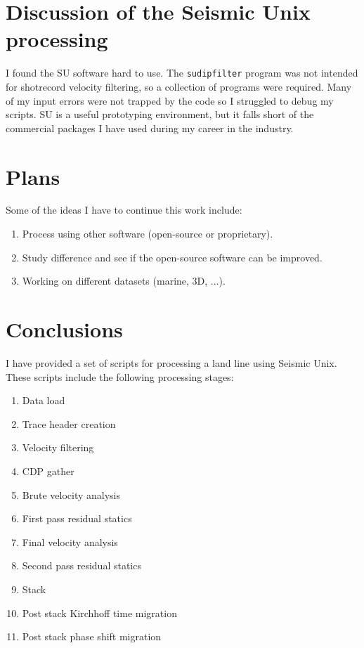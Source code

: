 \section{Discussion of the Seismic Unix processing}
I found the SU software hard to use.  The \texttt{sudipfilter} program
was not intended for shotrecord velocity filtering, so a collection of
programs were required.  Many of my input errors were not trapped by
the code so I struggled to debug my scripts.  SU is a useful
prototyping environment, but it falls short of the commercial packages
I have used during my career in the industry.

\section{Plans}
Some of the ideas I have to continue this work include:

\begin{enumerate}
\item Process using other software (open-source or proprietary). 
\item Study difference and see if the open-source software can be improved.
\item Working on different datasets (marine, 3D, ...).
\end{enumerate}

\section{Conclusions}
I have provided a set of scripts for processing a land line using
Seismic Unix. These scripts include the following processing stages:
\begin{enumerate}
\item Data load
\item Trace header creation
\item Velocity filtering 
\item CDP gather
\item Brute velocity analysis
\item First pass residual statics
\item Final velocity analysis
\item Second pass residual statics
\item Stack
\item Post stack Kirchhoff time migration
\item Post stack phase shift migration
\end{enumerate}

